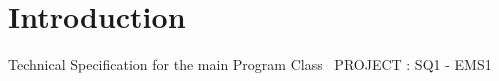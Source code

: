 \hypertarget{index_intro_sec}{}\section{Introduction}\label{index_intro_sec}
Technical Specification for the main Program Class~\newline
 P\+R\+O\+J\+E\+C\+T \+: S\+Q1 -\/ E\+M\+S1~\newline
 